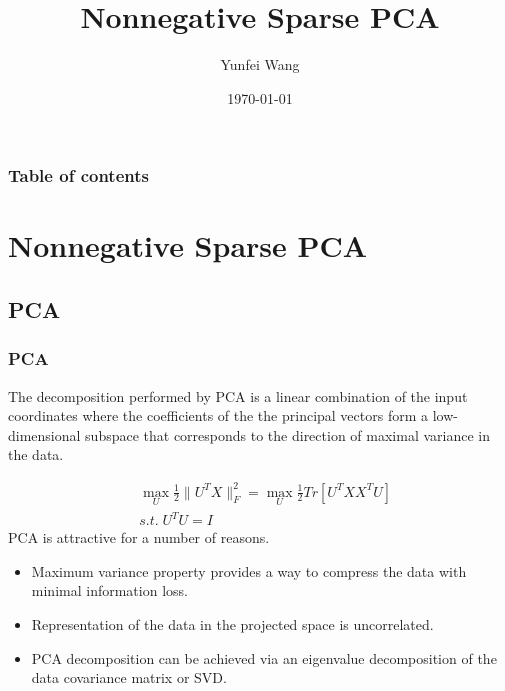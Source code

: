 \documentclass{beamer}
\title{Nonnegative Sparse PCA}
\author{Yunfei Wang}
\institute{Department of Computer Science \& Technology \\ Huazhong University of Science \& Technology}
\date{\today}
\begin{document}
\begin{frame}
\titlepage
\end{frame}


\begin{frame}\frametitle{Table of contents}\tableofcontents
\end{frame}


\section{Nonnegative Sparse PCA}
\subsection{PCA}
\begin{frame}\frametitle{PCA}
The decomposition performed by PCA is a linear combination of the input coordinates where the coefficients of the the principal vectors form a low-dimensional subspace that corresponds to the direction of maximal variance in the data.

\begin{equation}\label{eq:pca}
\begin{split}
&\max_U \frac{1}{2}\|U^TX\|_F^2=\max_U \frac{1}{2}Tr[U^TXX^TU]\\
&s.t.\; U^TU=I
\end{split}
\end{equation} 
PCA is attractive for a number of reasons.
\begin{itemize}
\item Maximum variance property provides a way to compress the data with minimal information loss.
\item Representation of the data in the projected space is uncorrelated.
\item PCA decomposition can be achieved via an eigenvalue decomposition of the data covariance matrix or SVD.
\end{itemize}
\end{frame}
\end{document}
